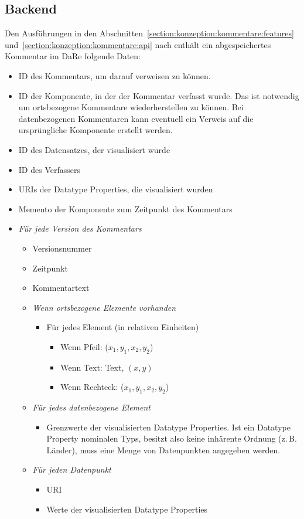\documentclass[
	headsepline,
	footsepline,
	fontsize=12pt,
	bibliography=totoc
]{scrbook}
\begin{document}
\subsection{Backend}
\label{section:konzeption:kommentare:backend}



Den Ausführungen in den Abschnitten~\ref{section:konzeption:kommentare:features} und~\ref{section:konzeption:kommentare:api} nach enthält ein abgespeichertes Kommentar im DaRe folgende Daten:

\begin{itemize}
	\item ID des Kommentars, um darauf verweisen zu können.
	\item ID der Komponente, in der der Kommentar verfasst wurde. Das ist notwendig um ortsbezogene Kommentare wiederherstellen zu können. Bei datenbezogenen Kommentaren kann eventuell ein Verweis auf die ursprüngliche Komponente erstellt werden.
	\item ID des Datensatzes, der visualisiert wurde
	\item ID des Verfassers
	\item URIs der Datatype Properties, die visualisiert wurden
	\item Memento der Komponente zum Zeitpunkt des Kommentars
	\item \textit{Für jede Version des Kommentars}
	\begin{itemize}
		\item Versionsnummer
		\item Zeitpunkt
		\item Kommentartext
		\item \textit{Wenn ortsbezogene Elemente vorhanden}
		\begin{itemize}
			\item Für jedes Element (in relativen Einheiten)
			\begin{itemize}
				\item Wenn Pfeil: ($x_1,y_1,x_2,y_2$)
				\item Wenn Text: Text, $(x,y)$
				\item Wenn Rechteck: ($x_1,y_1,x_2,y_2$)
			\end{itemize}
		\end{itemize}
	\item \textit{Für jedes datenbezogene Element}
		\begin{itemize}
			\item Grenzwerte der visualisierten Datatype Properties. Ist ein Datatype Property nominalen Typs, besitzt also keine inhärente Ordnung (z.\,B. Länder), muss eine Menge von Datenpunkten angegeben werden.
		\end{itemize}
	\item \textit{Für jeden Datenpunkt}
		\begin{itemize}
			\item URI
			\item Werte der visualisierten Datatype Properties
		\end{itemize}
	\end{itemize}
\end{itemize}
\end{document}
